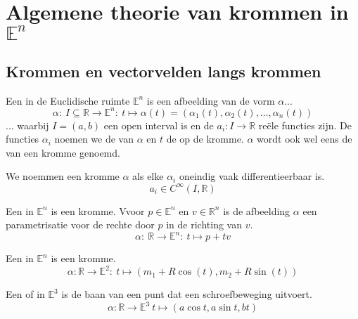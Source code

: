 \documentclass[main.tex]{subfiles}
\begin{document}
\chapter{Algemene theorie van krommen in $\mathbb{E}^{n}$}
\label{cha:algemene-theorie-van}

\section{Krommen en vectorvelden langs krommen}
\label{sec:kromm-en-vect}

\begin{de}
  Een  in de Euclidische ruimte $\mathbb{E}^{n}$ is een afbeelding van de vorm $\alpha$...
  \[ \alpha:\ I \subseteq \mathbb{R} \rightarrow \mathbb{E}^{n}:\ t \mapsto \alpha(t) = (\alpha_{1}(t), \alpha_{2}(t), \dotsc, \alpha_{n}(t)) \]
  ... waarbij $I=(a,b)$ een open interval is en de $a_{i}:I \rightarrow \mathbb{R}$ re\"ele functies zijn.
  De functies $\alpha_{i}$ noemen we de  van $\alpha$ en $t$ de  op de kromme.
  $\alpha$ wordt ook wel eens de  van een kromme genoemd.
\end{de}

\begin{de}
  We noemmen een kromme $\alpha$  als elke $\alpha_{i}$ oneindig vaak differentieerbaar is.
  \[ a_{i} \in C^{\infty}(I,\mathbb{R}) \]
\end{de}

\begin{de}
  Een  in $\mathbb{E}^{n}$ is een kromme.
  Vvoor $p\in \mathbb{E}^{n}$ en $v\in \mathbb{R}^{n}$ is de afbeelding $\alpha$ een parametrisatie voor de rechte door $p$ in de richting van $v$.
    \[ \alpha:\ \mathbb{R} \rightarrow \mathbb{E}^{n}:\ t \mapsto p+tv \]
\end{de}

\begin{de}
  Een  in $\mathbb{E}^{n}$ is een kromme.
  \[ \alpha: \mathbb{R} \rightarrow \mathbb{E}^{2}:\ t \mapsto (m_{1}+ R\cos(t),m_{2}+ R\sin(t)) \]
\end{de}

\begin{de}
  \examen
  Een  of  in $\mathbb{E}^{3}$ is de baan van een punt dat een schroefbeweging uitvoert.
  \[ \alpha: \mathbb{R} \rightarrow \mathbb{E}^{3}\ t \mapsto (a\cos t, a \sin t, bt) \]
\end{de}
\end{document}
